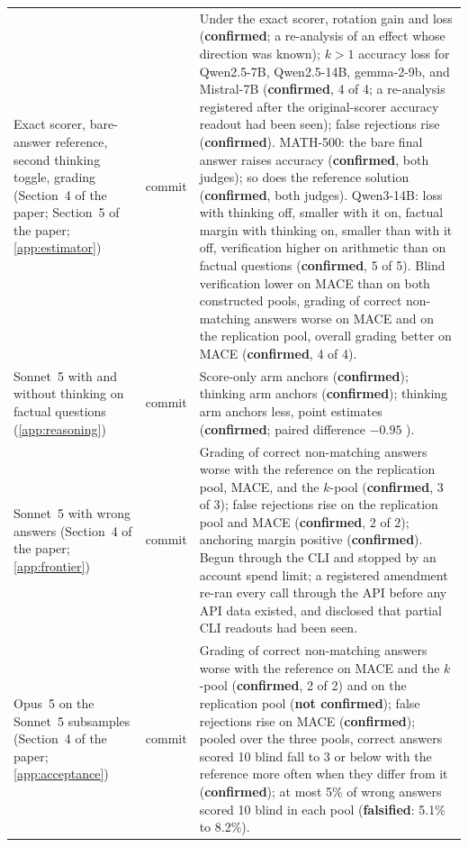 {\begin{longtable}{L{3.2cm}L{1.1cm}L{8.7cm}}
Exact scorer, bare-answer reference, second thinking toggle, grading (Section~4 of the paper; Section~5 of the paper; \cref{app:estimator}) & commit & Under the exact scorer, rotation gain and loss (\textbf{confirmed}; a re-analysis of an effect whose direction was known); $k{>}1$ accuracy loss for Qwen2.5-7B, Qwen2.5-14B, gemma-2-9b, and Mistral-7B (\textbf{confirmed}, 4 of 4; a re-analysis registered after the original-scorer accuracy readout had been seen); false rejections rise (\textbf{confirmed}). MATH-500: the bare final answer raises accuracy (\textbf{confirmed}, both judges); so does the reference solution (\textbf{confirmed}, both judges). Qwen3-14B: loss with thinking off, smaller with it on, factual margin with thinking on, smaller than with it off, verification higher on arithmetic than on factual questions (\textbf{confirmed}, 5 of 5). Blind verification lower on \textsc{MACE} than on both constructed pools, grading of correct non-matching answers worse on \textsc{MACE} and on the replication pool, overall grading better on \textsc{MACE} (\textbf{confirmed}, 4 of 4). \\
Sonnet~5 with and without thinking on factual questions (\cref{app:reasoning}) & commit & Score-only arm anchors (\textbf{confirmed}); thinking arm anchors (\textbf{confirmed}); thinking arm anchors less, point estimates (\textbf{confirmed}; paired difference $-0.95$ ). \\
Sonnet~5 with wrong answers (Section~4 of the paper; \cref{app:frontier}) & commit & Grading of correct non-matching answers worse with the reference on the replication pool, \textsc{MACE}, and the $k$-pool (\textbf{confirmed}, 3 of 3); false rejections rise on the replication pool and \textsc{MACE} (\textbf{confirmed}, 2 of 2); anchoring margin positive (\textbf{confirmed}). Begun through the CLI and stopped by an account spend limit; a registered amendment re-ran every call through the API before any API data existed, and disclosed that partial CLI readouts had been seen. \\
Opus~5 on the Sonnet~5 subsamples (Section~4 of the paper; \cref{app:acceptance}) & commit & Grading of correct non-matching answers worse with the reference on \textsc{MACE} and the $k$-pool (\textbf{confirmed}, 2 of 2) and on the replication pool (\textbf{not confirmed}); false rejections rise on \textsc{MACE} (\textbf{confirmed}); pooled over the three pools, correct answers scored 10 blind fall to 3 or below with the reference more often when they differ from it (\textbf{confirmed}); at most 5\% of wrong answers scored 10 blind in each pool (\textbf{falsified}: 5.1\% to 8.2\%). \\

\end{longtable}}

